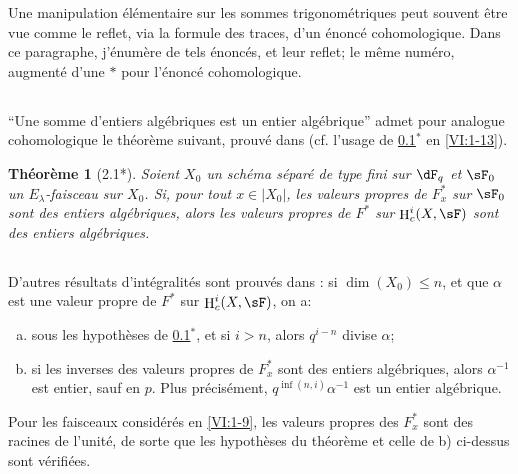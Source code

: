 \documentclass[oneside]{book}
\DeclareMathOperator{\h}{H}
\theoremstyle{sga-source}
\theoremstyle{sga-source-dash}
\theoremstyle{sga-source-dotdash}
\theoremstyle{sga-source-number-note-dash}
\theoremstyle{sga-source-note-number-dotdash}
\theoremstyle{sga-source-example-dotdash}
\theoremstyle{sga-source-inline-number}
\theoremstyle{sga-source-bare-number}
\theoremstyle{sga-source}
\newtheorem*{theorem*}{Théorème}
\begin{document}
Une manipulation élémentaire sur les sommes trigonométriques peut souvent 
être vue comme le reflet, via la formule des traces, d'un énoncé 
cohomologique. Dans ce paragraphe, j'énumère de tels énoncés, et leur 
reflet;  le même numéro, augmenté d'une $\ast$ pour 
l'énoncé cohomologique. 





\subsection{}\label{VI:2-1}

``Une somme d'entiers algébriques est un entier algébrique'' admet pour 
analogue cohomologique le théorème suivant, prouvé dans 
\cite[XXI 5.2.2]{sga7} (cf. l'usage de \ref{VI:2-1}$^\ast$ en 
\ref{VI:1-13}). 





\begin{theorem*}[2.1*]\label{VI:2-1*}
Soient $X_0$ un schéma séparé de type fini sur $\dF_q$ et $\sF_0$ un 
$E_\lambda$-faisceau sur $X_0$. Si, pour tout $x\in |X_0|$, les valeurs 
propres de $F_x^\ast$ sur $\sF_0$ sont des entiers algébriques, alors les 
valeurs propres de $F^\ast$ sur $\h_c^i(X,\sF)$ sont des entiers algébriques. 
\end{theorem*}





\subsection{}\label{VI:2-2}

D'autres résultats d'intégralités sont prouvés dans 
\cite[XXI, 5.2.2 et 5.4]{sga7}: si $\dim(X_0)\leqslant n$, et que $\alpha$ est 
une valeur propre de $F^\ast$ sur $\h_c^i(X,\sF)$, on a: 
\begin{enumerate}[a)]
  \item sous les hypothèses de \ref{VI:2-1}$^\ast$, et si $i>n$, alors 
    $q^{i-n}$ divise $\alpha$;
  \item si les inverses des valeurs propres de $F_x^\ast$ sont des entiers 
    algébriques, alors $\alpha^{-1}$ est entier, sauf en $p$. Plus 
    précisément, $q^{\inf(n,i)}\alpha^{-1}$ est un entier algébrique. 
\end{enumerate}

Pour les faisceaux considérés en \ref{VI:1-9}, les valeurs propres des 
$F_x^\ast$ sont des racines de l'unité, de sorte que les hypothèses du 
théorème et celle de b) ci-dessus sont vérifiées. 
\end{document}
